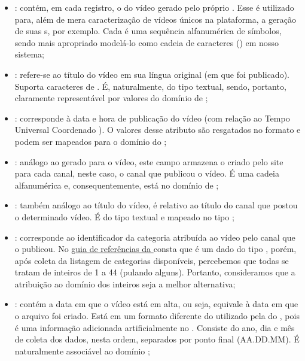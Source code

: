   \begin{itemize}
    \item {}: contém, em cada registro, o  do vídeo gerado pelo próprio . Esse  é utilizado para, além de mera caracterização de vídeos únicos na plataforma, a geração de suas s, por exemplo. Cada  é uma sequência alfanumérica de símbolos, sendo mais apropriado modelá-lo como cadeia de caracteres () em nosso sistema;
    \item {}: refere-se ao título do vídeo em sua língua original (em que foi publicado). Suporta caracteres de . É, naturalmente, do tipo textual, sendo, portanto, claramente representável por valores do domínio de ;
    \item {}: corresponde à data e hora de publicação do vídeo (com relação ao Tempo Universal Coordenado ). O valores desse atributo são resgatados no formato \href{https://www.w3.org/TR/NOTE-datetime}{} e podem ser mapeados para o domínio  do ;
    \item {}: análogo ao  gerado para o vídeo, este campo armazena o  criado pelo site para cada canal, neste caso, o canal que publicou o vídeo. É uma cadeia alfanumérica e, consequentemente, está no domínio de ;
    \item {}: também análogo ao título do vídeo, é relativo ao título do canal que postou o determinado vídeo. É do tipo textual e mapeado no tipo ;
    \item {}: corresponde ao identificador da categoria atribuída ao vídeo pelo canal que o publicou. No \href{https://developers.google.com/youtube/v3/docs/videos?hl=pt-br#snippet.categoryId}{guia de referências da } consta que é um dado do tipo , porém, após coleta da listagem de categorias disponíveis, percebemos que todas se tratam de inteiros de 1 a 44 (pulando alguns). Portanto, consideramos que a atribuição ao domínio dos inteiros seja a melhor alternativa;
    \item {}: contém a data em que o vídeo está em alta, ou seja, equivale à data em que o arquivo  foi criado. Está em um formato diferente do utilizado pela  do , pois é uma informação adicionada artificialmente no . Consiste do ano, dia e mês de coleta dos dados, nesta ordem, separados por ponto final (AA.DD.MM). É naturalmente associável ao domínio ;

\end{itemize}
